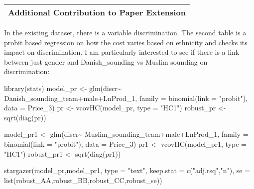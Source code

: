 \documentclass[
]{article}
\newenvironment{Shaded}{\begin{snugshade}}{\end{snugshade}}
\newcommand{\AttributeTok}[1]{\textcolor[rgb]{0.77,0.63,0.00}{#1}}
\newcommand{\FunctionTok}[1]{\textcolor[rgb]{0.00,0.00,0.00}{#1}}
\newcommand{\NormalTok}[1]{#1}
\newcommand{\OtherTok}[1]{\textcolor[rgb]{0.56,0.35,0.01}{#1}}
\newcommand{\SpecialCharTok}[1]{\textcolor[rgb]{0.00,0.00,0.00}{#1}}
\newcommand{\StringTok}[1]{\textcolor[rgb]{0.31,0.60,0.02}{#1}}
\begin{document}
\begin{longtable}[]{@{}c@{}}
\toprule
\endhead
Additional Contribution to Paper Extension \\
\bottomrule
\end{longtable}

In the existing dataset, there is a variable discrimination. The second
table is a probit based regression on how the cost varies based on
ethnicity and checks its impact on discrimination. I am particularly
interested to see if there is a link between just gender and
Danish\_sounding vs Muslim sounding on discrimination:

\begin{Shaded}
\begin{Highlighting}[]
\FunctionTok{library}\NormalTok{(stats)}
\NormalTok{model\_pr }\OtherTok{\textless{}{-}} \FunctionTok{glm}\NormalTok{(discr}\SpecialCharTok{\textasciitilde{}}\NormalTok{ Danish\_sounding\_team}\SpecialCharTok{+}\NormalTok{male}\SpecialCharTok{+}\NormalTok{LnProd\_1, }\AttributeTok{family =} \FunctionTok{binomial}\NormalTok{(}\AttributeTok{link =} \StringTok{"probit"}\NormalTok{), }\AttributeTok{data =}\NormalTok{ Price\_3)}
\NormalTok{pr }\OtherTok{\textless{}{-}} \FunctionTok{vcovHC}\NormalTok{(model\_pr, }\AttributeTok{type =} \StringTok{"HC1"}\NormalTok{)}
\NormalTok{robust\_pr }\OtherTok{\textless{}{-}} \FunctionTok{sqrt}\NormalTok{(}\FunctionTok{diag}\NormalTok{(pr))}

\NormalTok{model\_pr1 }\OtherTok{\textless{}{-}} \FunctionTok{glm}\NormalTok{(discr}\SpecialCharTok{\textasciitilde{}}\NormalTok{ Muslim\_sounding\_team}\SpecialCharTok{+}\NormalTok{male}\SpecialCharTok{+}\NormalTok{LnProd\_1, }\AttributeTok{family =} \FunctionTok{binomial}\NormalTok{(}\AttributeTok{link =} \StringTok{"probit"}\NormalTok{), }\AttributeTok{data =}\NormalTok{ Price\_3)}
\NormalTok{pr1 }\OtherTok{\textless{}{-}} \FunctionTok{vcovHC}\NormalTok{(model\_pr1, }\AttributeTok{type =} \StringTok{"HC1"}\NormalTok{)}
\NormalTok{robust\_pr1 }\OtherTok{\textless{}{-}} \FunctionTok{sqrt}\NormalTok{(}\FunctionTok{diag}\NormalTok{(pr1))}

\FunctionTok{stargazer}\NormalTok{(model\_pr,model\_pr1, }\AttributeTok{type =} \StringTok{"text"}\NormalTok{,}
          \AttributeTok{keep.stat =} \FunctionTok{c}\NormalTok{(}\StringTok{"adj.rsq"}\NormalTok{,}\StringTok{"n"}\NormalTok{),}
          \AttributeTok{se =} \FunctionTok{list}\NormalTok{(robust\_AA,robust\_BB,robust\_CC,robust\_se))}
\end{Highlighting}
\end{Shaded}
\end{document}
